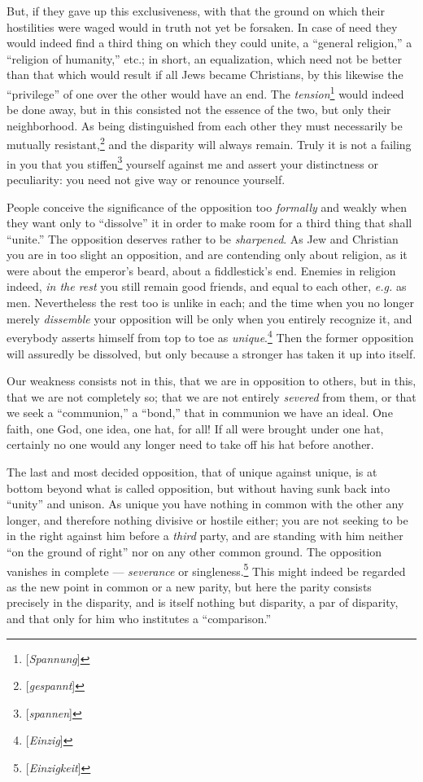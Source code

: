 But, if they gave up this exclusiveness, with that the ground on which their 
hostilities were waged would in truth not yet be forsaken. In case of need 
they would indeed find a third thing on which they could unite, a ``general 
religion,'' a ``religion of humanity,'' etc.; in short, an equalization, 
which need not be better than that which would result if all Jews became 
Christians, by this likewise the ``privilege'' of one over the other would 
have an end. The \textit{tension}\footnote{[\textit{Spannung}]} would indeed 
be done away, but in this consisted not the essence of the two, but only their 
neighborhood. As being distinguished from each other they must necessarily be 
mutually resistant,\footnote{[\textit{gespannt}]} and the disparity will 
always remain. Truly it is not a failing in you that you 
stiffen\footnote{[\textit{spannen}]} yourself against me and assert your 
distinctness or peculiarity: you need not give way or renounce yourself.

People conceive the significance of the opposition too \textit{formally} and 
weakly when they want only to ``dissolve'' it in order to make room for a 
third thing that shall ``unite.'' The opposition deserves rather to be 
\textit{sharpened}. As Jew and Christian you are in too slight an opposition, 
and are contending only about religion, as it were about the emperor's beard, 
about a fiddlestick's end. Enemies in religion indeed, \textit{in the rest} 
you still remain good friends, and equal to each other, \textit{e.g.} as men. 
Nevertheless the rest too is unlike in each; and the time when you no longer 
merely \textit{dissemble} your opposition will be only when you entirely 
recognize it, and everybody asserts himself from top to toe as 
\textit{unique}.\footnote{[\textit{Einzig}]} Then the former opposition will 
assuredly be dissolved, but only because a stronger has taken it up into 
itself.

Our weakness consists not in this, that we are in opposition to others, but in 
this, that we are not completely so; that we are not entirely \textit{severed} 
from them, or that we seek a ``communion,'' a ``bond,'' that in communion 
we have an ideal. One faith, one God, one idea, one hat, for all! If all were 
brought under one hat, certainly no one would any longer need to take off his 
hat before another.

The last and most decided opposition, that of unique against unique, is at 
bottom beyond what is called opposition, but without having sunk back into 
``unity'' and unison. As unique you have nothing in common with the other 
any longer, and therefore nothing divisive or hostile either; you are not 
seeking to be in the right against him before a \textit{third} party, and are 
standing with him neither ``on the ground of right'' nor on any other common 
ground. The opposition vanishes in complete --- \textit{severance} or 
singleness.\footnote{[\textit{Einzigkeit}]} This might indeed be regarded as 
the new point in common or a new parity, but here the parity consists 
precisely in the disparity, and is itself nothing but disparity, a par of 
disparity, and that only for him who institutes a ``comparison.''

